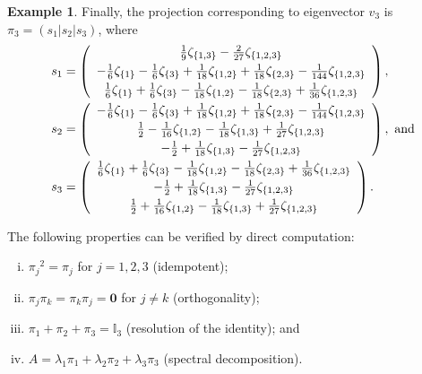 \documentclass{article}
\theoremstyle{definition}
\newtheorem{example}[theorem]{Example}
\newcommand{\zm}{\mathbf{0}}
\newcommand{\mI}{\mathbb{I}}
\numberwithin{equation}{section}
\begin{document}
\begin{example}
Finally, the projection corresponding to eigenvector $v_3$ is $\pi_3=(s_1\vert s_2\vert s_3)$, where 
\begin{align*}
s_1&=\left(
\begin{array}{c}
 \frac{1}{9} \zeta _{\{1,3\}}-\frac{2}{27} \zeta _{\{1,2,3\}}\vspace{3pt} \\
 -\frac{1}{6}\zeta _{\{1\}}-\frac{1}{6}\zeta _{\{3\}}+\frac{1}{18} \zeta _{\{1,2\}}+\frac{1}{18} \zeta _{\{2,3\}}-\frac{1}{144} \zeta _{\{1,2,3\}} \vspace{3pt}\\
 \frac{1}{6}\zeta _{\{1\}}+\frac{1}{6}\zeta _{\{3\}}-\frac{1}{18} \zeta _{\{1,2\}}-\frac{1}{18} \zeta _{\{2,3\}}+\frac{1}{36} \zeta _{\{1,2,3\}} 
\end{array}
\right),\\
s_2&=\left(
\begin{array}{c}
 -\frac{1}{6}\zeta _{\{1\}}-\frac{1}{6}\zeta _{\{3\}}+\frac{1}{18} \zeta _{\{1,2\}}+\frac{1}{18} \zeta _{\{2,3\}}-\frac{1}{144} \zeta _{\{1,2,3\}} \vspace{3pt}\\
 \frac{1}{2}-\frac{1}{16} \zeta _{\{1,2\}}-\frac{1}{18} \zeta _{\{1,3\}}+\frac{1}{27} \zeta _{\{1,2,3\}} \vspace{3pt}\\
 -\frac{1}{2}+\frac{1}{18} \zeta _{\{1,3\}}-\frac{1}{27} \zeta _{\{1,2,3\}} 
\end{array}
\right),\text{ \rm and}\\
s_3&=\left(
\begin{array}{c}
\frac{1}{6}\zeta _{\{1\}}+\frac{1}{6}\zeta _{\{3\}} -\frac{1}{18} \zeta _{\{1,2\}}-\frac{1}{18} \zeta _{\{2,3\}}+\frac{1}{36} \zeta _{\{1,2,3\}} \vspace{3pt}\\
 -\frac{1}{2}+\frac{1}{18} \zeta _{\{1,3\}}-\frac{1}{27} \zeta _{\{1,2,3\}} \vspace{3pt}\\
\frac{1}{2}+ \frac{1}{16} \zeta _{\{1,2\}}-\frac{1}{18} \zeta _{\{1,3\}}+\frac{1}{27} \zeta _{\{1,2,3\}} 
\end{array}
\right).
\end{align*}


The following properties can  be verified by direct computation:
\begin{enumerate}[i.]
\item ${\pi_j}^2=\pi_j$ for $j=1, 2, 3$ (idempotent);
\item $\pi_j\pi_k=\pi_k\pi_j=\zm$ for $j\ne k$ (orthogonality);
\item $\pi_1+\pi_2+\pi_3=\mI_3$ (resolution of the identity); and 
\item $A=\lambda_1\pi_1+\lambda_2\pi_2+\lambda_3\pi_3$ (spectral decomposition).
\end{enumerate}
\end{example}
\end{document}
